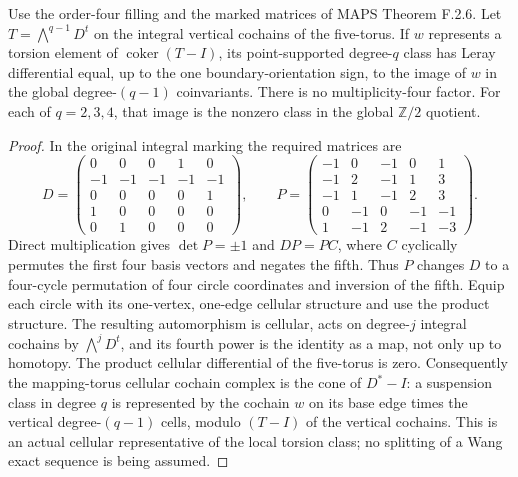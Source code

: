 \begin{lemma}
\label{mapsaudit:order-four-torsion-transgression}
Use the order-four filling and the marked matrices of MAPS Theorem F.2.6.
Let $T=\bigwedge^{q-1}D^t$ on the integral vertical cochains of the
five-torus. If $w$ represents a torsion element of
$\operatorname{coker}(T-I)$, its point-supported degree-$q$ class has
Leray differential equal, up to the one boundary-orientation sign, to
the image of $w$ in the global degree-$(q-1)$ coinvariants. There is
no multiplicity-four factor. For each of $q=2,3,4$, that image is
the nonzero class in the global $\mathbb Z/2$ quotient.
\end{lemma}
\begin{proof}
In the original integral marking the required matrices are
\[
D=\begin{pmatrix}
0&0&0&1&0\\-1&-1&-1&-1&-1\\0&0&0&0&1\\
1&0&0&0&0\\0&1&0&0&0
\end{pmatrix},\qquad
P=\begin{pmatrix}
-1&0&-1&0&1\\-1&2&-1&1&3\\-1&1&-1&2&3\\
0&-1&0&-1&-1\\1&-1&2&-1&-3
\end{pmatrix}.
\]
Direct multiplication gives $\det P=\pm1$ and $DP=PC$, where
$C$ cyclically permutes the first four basis vectors and negates the
fifth. Thus $P$ changes $D$ to a four-cycle permutation of four circle
coordinates and inversion of the fifth.
Equip each circle with its one-vertex, one-edge cellular structure
and use the product structure. The resulting automorphism is cellular,
acts on degree-$j$ integral cochains by $\bigwedge^jD^t$, and its
fourth power is the identity as a map, not only up to homotopy.
The product cellular differential of the five-torus is zero.
Consequently the mapping-torus cellular cochain complex is the cone
of $D^*-I$: a suspension class in degree $q$ is represented by
the cochain $w$ on its base edge times the vertical
degree-$(q-1)$ cells, modulo $(T-I)$ of the vertical cochains.
This is an actual cellular representative of the local torsion
class; no splitting of a Wang exact sequence is being assumed.


\end{proof}
